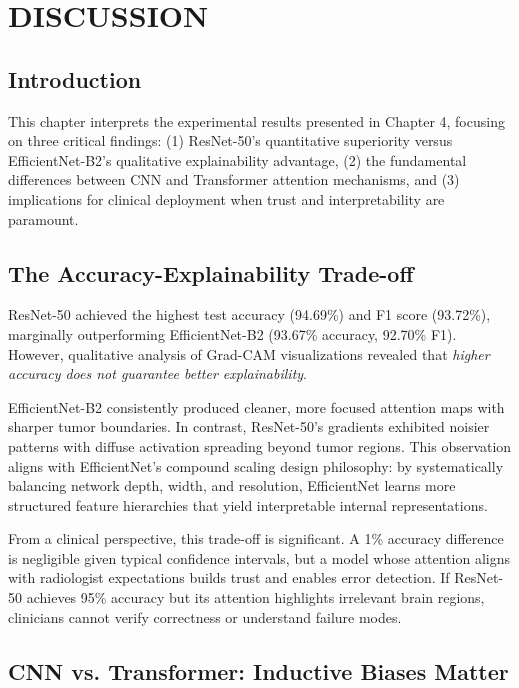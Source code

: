 \chapter{DISCUSSION}
\label{ch:discussion}

\section{Introduction}

This chapter interprets the experimental results presented in Chapter 4, focusing on three critical findings: (1) ResNet-50's quantitative superiority versus EfficientNet-B2's qualitative explainability advantage, (2) the fundamental differences between CNN and Transformer attention mechanisms, and (3) implications for clinical deployment when trust and interpretability are paramount.

\section{The Accuracy-Explainability Trade-off}

ResNet-50 achieved the highest test accuracy (94.69\%) and F1 score (93.72\%), marginally outperforming EfficientNet-B2 (93.67\% accuracy, 92.70\% F1). However, qualitative analysis of Grad-CAM visualizations revealed that \textit{higher accuracy does not guarantee better explainability}.

EfficientNet-B2 consistently produced cleaner, more focused attention maps with sharper tumor boundaries. In contrast, ResNet-50's gradients exhibited noisier patterns with diffuse activation spreading beyond tumor regions. This observation aligns with EfficientNet's compound scaling design philosophy: by systematically balancing network depth, width, and resolution, EfficientNet learns more structured feature hierarchies that yield interpretable internal representations.

From a clinical perspective, this trade-off is significant. A 1\% accuracy difference is negligible given typical confidence intervals, but a model whose attention aligns with radiologist expectations builds trust and enables error detection. If ResNet-50 achieves 95\% accuracy but its attention highlights irrelevant brain regions, clinicians cannot verify correctness or understand failure modes.

\section{CNN vs. Transformer: Inductive Biases Matter}

